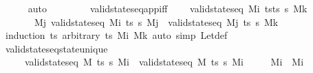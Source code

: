 \begin{isabellebody}
%
\isadelimproof
\ \ \ \ %
\endisadelimproof
%
\isatagproof
{}\isamarkupfalse%
\ auto%
\endisatagproof
{\isafoldproof}%
%
\isadelimproof
\isanewline
%
\endisadelimproof
\ \ \ \ \isanewline
\ \ \isamarkupfalse%
\ valid{\isacharunderscore}{\kern0pt}state{\isacharunderscore}{\kern0pt}seq{\isacharunderscore}{\kern0pt}app{\isacharunderscore}{\kern0pt}iff{\isacharcolon}{\kern0pt}\isanewline
\ \ \ \ {\isachardoublequoteopen}valid{\isacharunderscore}{\kern0pt}state{\isacharunderscore}{\kern0pt}seq\ M\isactrlsub i\ {\isacharparenleft}{\kern0pt}tsts\ {\isasympi}s\ M\isactrlsub k\ \isanewline
\ \ \ \ \ \ {\isasymlongleftrightarrow}\ {\isacharparenleft}{\kern0pt}{\isasymexists}M\isactrlsub j{\isachardot}{\kern0pt}\ valid{\isacharunderscore}{\kern0pt}state{\isacharunderscore}{\kern0pt}seq\ M\isactrlsub i\ ts\ {\isasympi}s\ M\isactrlsub j\ {\isasymand}\ valid{\isacharunderscore}{\kern0pt}state{\isacharunderscore}{\kern0pt}seq\ M\isactrlsub j\ ts\ {\isasympi}s\ M\isactrlsub k{\isacharparenright}{\kern0pt}{\isachardoublequoteclose}\isanewline
%
\isadelimproof
\ \ \ \ \isanewline
\ \ \ \ %
\endisadelimproof
%
\isatagproof
{}\isamarkupfalse%
\ {\isacharparenleft}{\kern0pt}induction\ ts\ arbitrary{\isacharcolon}{\kern0pt}\ ts\ M\isactrlsub i\ M\isactrlsub k{\isacharparenright}{\kern0pt}\ {\isacharparenleft}{\kern0pt}auto\ simp{\isacharcolon}{\kern0pt}\ Let{\isacharunderscore}{\kern0pt}def{\isacharparenright}{\kern0pt}%
\endisatagproof
{\isafoldproof}%
%
\isadelimproof
\isanewline
%
\endisadelimproof
\isanewline
\ \ \isamarkupfalse%
\ valid{\isacharunderscore}{\kern0pt}state{\isacharunderscore}{\kern0pt}seq{\isacharunderscore}{\kern0pt}state{\isacharunderscore}{\kern0pt}unique{\isacharcolon}{\kern0pt}\isanewline
\ \ \ \ \ {\isachardoublequoteopen}valid{\isacharunderscore}{\kern0pt}state{\isacharunderscore}{\kern0pt}seq\ M\ ts\ {\isasympi}s\ M\isactrlsub i{\isachardoublequoteclose}\ \ {\isachardoublequoteopen}valid{\isacharunderscore}{\kern0pt}state{\isacharunderscore}{\kern0pt}seq\ M\ ts\ {\isasympi}s\ M\isactrlsub i{\isacharprime}{\kern0pt}{\isachardoublequoteclose}\isanewline
\ \ \ \ \ {\isachardoublequoteopen}M\isactrlsub i\ {\isacharequal}{\kern0pt}\ M\isactrlsub i{\isacharprime}{\kern0pt}{\isachardoublequoteclose}\isanewline

\end{isabellebody}
